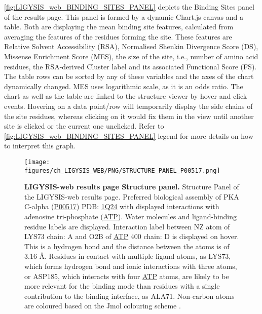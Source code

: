 \autoref{fig:LIGYSIS_web_BINDING_SITES_PANEL} depicts the Binding Sites panel of the results page. This panel is formed by a dynamic Chart.js canvas and a table. Both are displaying the mean binding site features, calculated from averaging the features of the residues forming the site. These features are Relative Solvent Accessibility (RSA), Normalised Shenkin Divergence Score (DS), Missense Enrichment Score (MES), the size of the site, i.e., number of amino acid residues, the RSA-derived Cluster label and its associated Functional Score (FS). The table rows can be sorted by any of these variables and the axes of the chart dynamically changed. MES uses logarithmic scale, as it is an odds ratio. The chart as well as the table are linked to the structure viewer by hover and click events. Hovering on a data point/row will temporarily display the side chains of the site residues, whereas clicking on it would fix them in the view until another site is clicked or the current one unclicked. Refer to \autoref{fig:LIGYSIS_web_BINDING_SITES_PANEL} legend for more details on how to interpret this graph.

\begin{figure}[htb!]
    \centering
    \texttt{[image: figures/ch\_LIGYSIS\_WEB/PNG/STRUCTURE\_PANEL\_P00517.png]}
    \caption[LIGYSIS-web results page Structure Panel]{\textbf{LIGYSIS-web results page Structure panel.} Structure Panel of the LIGYSIS-web results page. Preferred biological assembly of PKA C-alpha (\href{https://www.uniprot.org/uniprotkb/P00517/entry}{P00517}) PDB: \href{https://www.ebi.ac.uk/pdbe/entry/pdb/1Q24}{1Q24} \cite{GAEL_2003_AKT} with displayed interactions with adenosine tri-phosphate (\href{https://www.ebi.ac.uk/pdbe-srv/pdbechem/chemicalCompound/show/ATP}{ATP}). Water molecules and ligand-binding residue labels are displayed. Interaction label between NZ atom of LYS73 chain: A and O2B of \href{https://www.ebi.ac.uk/pdbe-srv/pdbechem/chemicalCompound/show/ATP}{ATP} 400 chain: D is displayed on hover. This is a hydrogen bond and the distance between the atoms is of 3.16 \AA{}. Residues in contact with multiple ligand atoms, as LYS73, which forms hydrogen bond and ionic interactions with three atoms, or ASP185, which interacts with four \href{https://www.ebi.ac.uk/pdbe-srv/pdbechem/chemicalCompound/show/ATP}{ATP} atoms, are likely to be more relevant for the binding mode than residues with a single contribution to the binding interface, as ALA71. Non-carbon atoms are coloured based on the Jmol colouring scheme \cite{JMOL}.}
    \label{fig:LIGYSIS_web_STRUCTURE_PANEL}
\end{figure}

